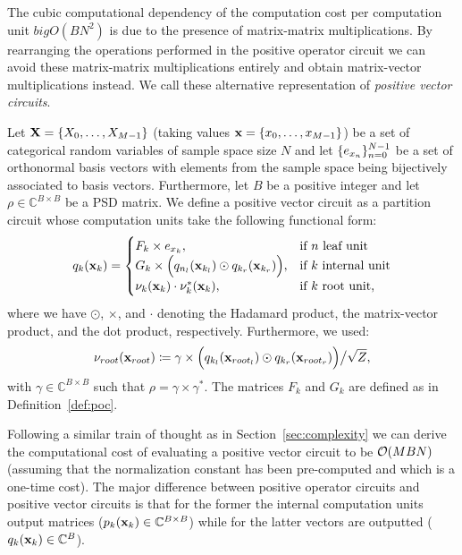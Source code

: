The cubic computational dependency of the computation cost per computation unit $bigO (BN^2)$ is due to the presence of matrix-matrix multiplications. By rearranging the operations performed in the positive operator circuit we can avoid these matrix-matrix multiplications entirely and obtain matrix-vector multiplications instead. We call these alternative representation of \pocs \textit{positive vector circuits}.

\begin{definition}
	\label{def:vpox}
	Let $\mathbf{X}=\{X_0,\dots ,X_{M-1}  \}$ (taking values  $\mathbf{x}=\{x_0,\dots ,x_{M-1}  \}$) be a set of categorical random variables of sample space size $N$ and let $\{e_{x_n} \}_{n=0}^{N-1}$ be a set of orthonormal basis vectors with elements from the sample space being bijectively associated to basis vectors. Furthermore, let $B$ be a positive integer and let $\rho \in \mathbb{C}^{B\times B}$ be a PSD matrix.
	We define a positive vector circuit as a partition circuit whose computation units take the following functional form:
	\begin{align}
		{\ensuremath{q}}_k(\mathbf{x}_k)=
		\begin{cases}
			F_{k} \times  e_{x_k},
			 & \text{if $n$ leaf unit}
			\\
			G_k \times \Bigl( q_{n_l}(\mathbf{x}_{k_l}) \odot  q_{k_r} (\mathbf{x}_{k_r}) \Bigr),
			 & \text{if $k$ internal unit}
			\\
			\nu_{k}(\mathbf{x}_k)  \cdot \nu^*_k(\mathbf{x}_k),
			 & \text{if $k$ root unit,}
		\end{cases}
		\label{eq:vector_units}
	\end{align}
	where we have $\odot$, $\times$, and $\cdot$ denoting the Hadamard product, the matrix-vector product, and the dot product, respectively. Furthermore, we used:
	\begin{align}
		\nu_{root}(\mathbf{x}_{root})
		\coloneqq
		\gamma
		\times
		\Bigl(
		q_{k_l}(\mathbf{x}_{root_l})
		\odot
		q_{k_r}(\mathbf{x}_{root_r})
		\Bigr)
		\big/ \sqrt{Z},
		\label{eq:pvc:def}
	\end{align}
	with $\gamma \in \mathbb{C}^{B\times B}$ such that $\rho = \gamma \times \gamma^*$. The matrices $F_k$ and $G_k$ are defined as in Definition~\ref{def:poc}.
\end{definition}
Following a similar train of thought as in Section~\ref{sec:complexity} we can derive the computational cost of evaluating a positive vector circuit to be $\mathcal{O} (M B N)$ (assuming that the normalization constant has been pre-computed and which is a one-time cost).
The major difference between positive operator circuits and positive vector circuits is that for the former the internal computation units output matrices ($p_k(\mathbf{x}_k)\in \mathbb{C}^{B\times B}$) while for the latter vectors are outputted ($q_k(\mathbf{x}_k)\in \mathbb{C}^{B}$).


